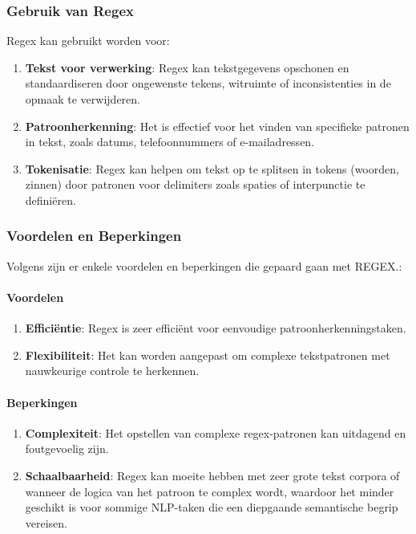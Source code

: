 \subsubsection{Gebruik van Regex}
Regex kan gebruikt worden voor:
\begin{enumerate}
    \item \textbf{Tekst voor verwerking}: Regex kan tekstgegevens opschonen en standaardiseren door ongewenste tekens, witruimte of inconsistenties in de opmaak te verwijderen.
    \item \textbf{Patroonherkenning}: Het is effectief voor het vinden van specifieke patronen in tekst, zoals datums, telefoonnummers of e-mailadressen.
    \item \textbf{Tokenisatie}: Regex kan helpen om tekst op te splitsen in tokens (woorden, zinnen) door patronen voor delimiters zoals spaties of interpunctie te definiëren.
\end{enumerate}

\subsubsection{Voordelen en Beperkingen}
Volgens \textcite{B_2022} zijn er enkele voordelen en beperkingen die gepaard gaan met REGEX.:
\paragraph{Voordelen}
\begin{enumerate}
    \item \textbf{Efficiëntie}: Regex is zeer efficiënt voor eenvoudige patroonherkenningstaken.
    \item \textbf{Flexibiliteit}: Het kan worden aangepast om complexe tekstpatronen met nauwkeurige controle te herkennen.
\end{enumerate}
\paragraph{Beperkingen}
\begin{enumerate}
    \item \textbf{Complexiteit}: Het opstellen van complexe regex-patronen kan uitdagend en foutgevoelig zijn.
    \item \textbf{Schaalbaarheid}: Regex kan moeite hebben met zeer grote tekst corpora of wanneer de logica van het patroon te complex wordt, waardoor het minder geschikt is voor sommige NLP-taken die een diepgaande semantische begrip vereisen.
\end{enumerate}



